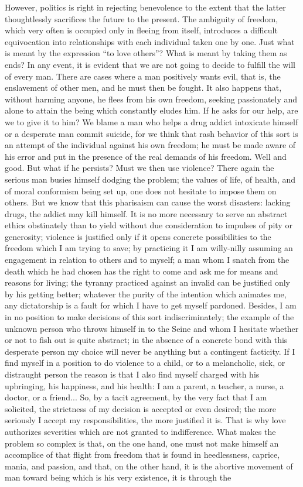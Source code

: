 \documentclass[11pt]{article}
\begin{document}
{{However, politics is right in rejecting benevolence to the extent that the latter thoughtlessly sacrifices the future to the present. The ambiguity of freedom, which very often is occupied only in fleeing from itself, introduces a difficult equivocation into relationships with each individual taken one by one. Just what is meant by the expression “to love others”? What is meant by taking them as ends? In any event, it is evident that we are not going to decide to fulfill the will of every man. There are cases where a man positively wants evil, that is, the enslavement of other men, and he must then be fought. It also happens that, without harming anyone, he flees from his own freedom, seeking passionately and alone to attain the being which constantly eludes him. If he asks for our help, are we to give it to him? We blame a man who helps a drug addict intoxicate himself or a desperate man commit suicide, for we think that rash behavior of this sort is an attempt of the individual against his own freedom; he must be made aware of his error and put in the presence of the real demands of his freedom. Well and good. But what if he persists? Must we then use violence? There again the serious man busies himself dodging the problem; the values of life, of health, and of moral conformism being set up, one does not hesitate to impose them on others. But we know that this pharisaism can cause the worst disasters: lacking drugs, the addict may kill himself. It is no more necessary to serve an abstract ethics obstinately than to yield without due consideration to impulses of pity or generosity; violence is justified only if it opens concrete possibilities to the freedom which I am trying to save; by practicing it I am willy-nilly assuming an engagement in relation to others and to myself; a man whom I snatch from the death which he had chosen has the right to come and ask me for means and reasons for living; the tyranny practiced against an invalid can be justified only by his getting better; whatever the purity of the intention which animates me, any dictatorship is a fault for which I have to get myself pardoned. Besides, I am in no position to make decisions of this sort indiscriminately; the example of the unknown person who throws himself in to the Seine and whom I hesitate whether or not to fish out is quite abstract; in the absence of a concrete bond with this desperate person my choice will never be anything but a contingent facticity. If I find myself in a position to do violence to a child, or to a melancholic, sick, or distraught person the reason is that I also find myself charged with his upbringing, his happiness, and his health: I am a parent, a teacher, a nurse, a doctor, or a friend... So, by a tacit agreement, by the very fact that I am solicited, the strictness of my decision is accepted or even desired; the more seriously I accept my responsibilities, the more justified it is. That is why love authorizes severities which are not granted to indifference. What makes the problem so complex is that, on the one hand, one must not make himself an accomplice of that flight from freedom that is found in heedlessness, caprice, mania, and passion, and that, on the other hand, it is the abortive movement of man toward being which is his very existence, it is through the }}
\end{document}
